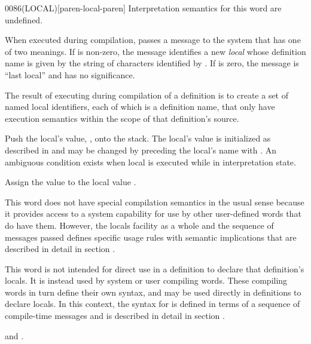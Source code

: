 \begin{worddef}[LOCAL]{0086}{(LOCAL)}[paren-local-paren]
\interpret
	Interpretation semantics for this word are undefined.

\execute

	When executed during compilation,  passes a
	message to the system that has one of two meanings. If 
	is non-zero, the message identifies a new \emph{local} whose
	definition name is given by the string of characters identified
	by . If  is zero, the message is ``last
	local'' and  has no significance.

	The result of executing  during compilation of a
	definition is to create a set of named local identifiers, each
	of which is a definition name, that only have execution
	semantics within the scope of that definition's source.

\execute[local]

	Push the local's value, , onto the stack. The local's
	value is initialized as described in  and may be changed by preceding the local's
	name with . An ambiguous condition exists when local is
	executed while in interpretation state.

 

	Assign the value  to the local value .

\note
	This word does not have special compilation semantics in the
	usual sense because it provides access to a system capability
	for use by other user-defined words that do have them. However,
	the locals facility as a whole and the sequence of messages
	passed defines specific usage rules with semantic implications
	that are described in detail in section
	.

\note
	This word is not intended for direct use in a definition to
	declare that definition's locals. It is instead used by system
	or user compiling words. These compiling words in turn define
	their own syntax, and may be used directly in definitions to
	declare locals. In this context, the syntax for 
	is defined in terms of a sequence of compile-time messages and
	is described in detail in section .

\see {} and
	.
\end{worddef}


